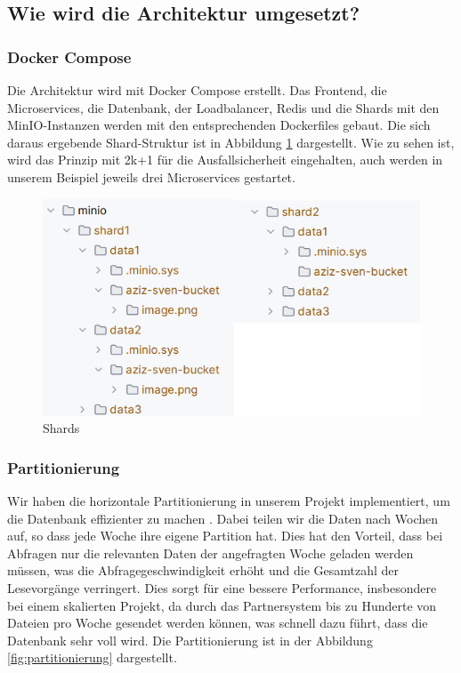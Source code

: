 \documentclass[12pt]{report}
\begin{document}
		\subsection{Wie wird die Architektur umgesetzt?}
			\subsubsection{Docker Compose}
				Die Architektur wird mit Docker Compose erstellt. Das Frontend, die Microservices, die Datenbank, der Loadbalancer, Redis und die Shards mit den MinIO-Instanzen werden mit den entsprechenden Dockerfiles gebaut. Die sich daraus ergebende Shard-Struktur ist in Abbildung \ref{fig:shards} dargestellt. Wie zu sehen ist, wird das Prinzip mit 2k+1 für die Ausfallsicherheit eingehalten, auch werden in unserem Beispiel jeweils drei Microservices gestartet.
		
				\begin{figure}[h]
					\centering
					\includegraphics[width=0.8\linewidth]{shards}
					\caption{Shards}
					\label{fig:shards}
				\end{figure}
			
			\subsubsection{Partitionierung}
				Wir haben die horizontale Partitionierung in unserem Projekt implementiert, um die Datenbank effizienter zu machen \cite{alsultanny2010database}. Dabei teilen wir die Daten nach Wochen auf, so dass jede Woche ihre eigene Partition hat. Dies hat den Vorteil, dass bei Abfragen nur die relevanten Daten der angefragten Woche geladen werden müssen, was die Abfragegeschwindigkeit erhöht und die Gesamtzahl der Lesevorgänge verringert. Dies sorgt für eine bessere Performance, insbesondere bei einem skalierten Projekt, da durch das Partnersystem bis zu Hunderte von Dateien pro Woche gesendet werden können, was schnell dazu führt, dass die Datenbank sehr voll wird. Die Partitionierung ist in der Abbildung \ref{fig:partitionierung} dargestellt.
				
\end{document}
